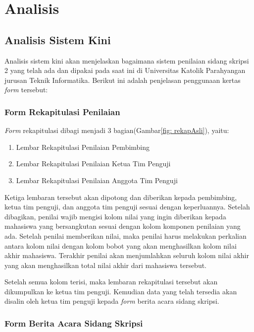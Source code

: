 \chapter{Analisis}
\label{chap: analisis}

\section{Analisis Sistem Kini}
\label{sec: analisiSKini}

Analisis sistem kini akan menjelaskan bagaimana sistem penilaian sidang skripsi 2 yang telah ada dan dipakai pada saat ini di Universitas Katolik Parahyangan jurusan Teknik Informatika. Berikut ini adalah penjelasan penggunaan kertas \textit{form} tersebut:

	\subsection{Form Rekapitulasi Penilaian}
	\label{sub: rekapPenil}
	
	\textit{Form} rekapitulasi dibagi menjadi 3 bagian(Gambar\ref{fig: rekapAsli}), yaitu:
		\begin{enumerate}
			\item Lembar Rekapitulasi Penilaian Pembimbing
			\item Lembar Rekapitulasi Penilaian Ketua Tim Penguji
			\item Lembar Rekapitulasi Penilaian Anggota Tim Penguji
		\end{enumerate}
	
	Ketiga lembaran tersebut akan dipotong dan diberikan kepada pembimbing, ketua tim penguji, dan anggota tim penguji sesuai dengan keperluannya. Setelah dibagikan, penilai wajib mengisi kolom nilai yang ingin diberikan kepada mahasiswa yang bersangkutan sesuai dengan kolom komponen penilaian yang ada. Setelah penilai memberikan nilai, maka penilai harus melakukan perkalian antara kolom nilai dengan kolom bobot yang akan menghasilkan kolom nilai akhir mahasiswa. Terakhir penilai akan menjumlahkan seluruh kolom nilai akhir yang akan menghasilkan total nilai akhir dari mahasiswa tersebut.
	
	Setelah semua kolom terisi, maka lembaran rekapitulasi tersebut akan dikumpulkan ke ketua tim penguji. Kemudian data yang telah tersedia akan disalin oleh ketua tim penguji kepada \textit{form} berita acara sidang skripsi.
	
	\subsection{Form Berita Acara Sidang Skripsi}
	\label{sub: formSkripsi}
	
